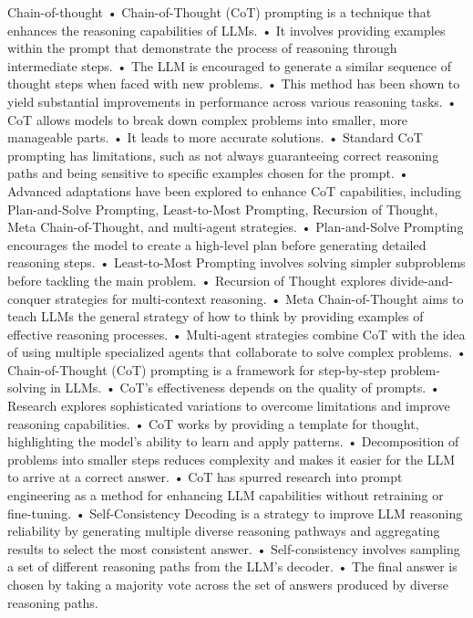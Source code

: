 \begin{frame}{Chain-of-thought}
	•	Chain-of-Thought (CoT) prompting is a technique that enhances the reasoning capabilities of LLMs.
	•	It involves providing examples within the prompt that demonstrate the process of reasoning through intermediate steps.
	•	The LLM is encouraged to generate a similar sequence of thought steps when faced with new problems.
	•	This method has been shown to yield substantial improvements in performance across various reasoning tasks.
	•	CoT allows models to break down complex problems into smaller, more manageable parts.
	•	It leads to more accurate solutions.
	•	Standard CoT prompting has limitations, such as not always guaranteeing correct reasoning paths and being sensitive to specific examples chosen for the prompt.
	•	Advanced adaptations have been explored to enhance CoT capabilities, including Plan-and-Solve Prompting, Least-to-Most Prompting, Recursion of Thought, Meta Chain-of-Thought, and multi-agent strategies.
	•	Plan-and-Solve Prompting encourages the model to create a high-level plan before generating detailed reasoning steps.
	•	Least-to-Most Prompting involves solving simpler subproblems before tackling the main problem.
	•	Recursion of Thought explores divide-and-conquer strategies for multi-context reasoning.
	•	Meta Chain-of-Thought aims to teach LLMs the general strategy of how to think by providing examples of effective reasoning processes.
	•	Multi-agent strategies combine CoT with the idea of using multiple specialized agents that collaborate to solve complex problems.
	•	Chain-of-Thought (CoT) prompting is a framework for step-by-step problem-solving in LLMs.
	•	CoT’s effectiveness depends on the quality of prompts.
	•	Research explores sophisticated variations to overcome limitations and improve reasoning capabilities.
	•	CoT works by providing a template for thought, highlighting the model’s ability to learn and apply patterns.
	•	Decomposition of problems into smaller steps reduces complexity and makes it easier for the LLM to arrive at a correct answer.
	•	CoT has spurred research into prompt engineering as a method for enhancing LLM capabilities without retraining or fine-tuning.
	•	Self-Consistency Decoding is a strategy to improve LLM reasoning reliability by generating multiple diverse reasoning pathways and aggregating results to select the most consistent answer.
	•	Self-consistency involves sampling a set of different reasoning paths from the LLM’s decoder.
	•	The final answer is chosen by taking a majority vote across the set of answers produced by diverse reasoning paths.

\end{frame}
